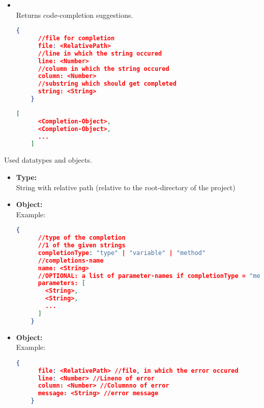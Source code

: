 \begin{itemize}
  \item {} \\
  Returns code-completion suggestions. \\
  \begin{lstlisting}[basicstyle=\small,
    language=json]
    {
      //file for completion
      file: <RelativePath>
      //line in which the string occured
      line: <Number>
      //column in which the string occured
      column: <Number>
      //substring which should get completed
      string: <String>
    }
  \end{lstlisting}
  \begin{lstlisting}[basicstyle=\small,
    language=json]
    [
      <Completion-Object>,
      <Completion-Object>,
      ...
    ]
  \end{lstlisting}
\end{itemize}

Used datatypes and objects.
\begin{itemize}
  \item \textbf{Type:}  \\
  String with relative path (relative to the root-directory of the project)

  \item \textbf{Object:}  \\
  Example:
  \begin{lstlisting}[basicstyle=\small,
    language=json]
    {
      //type of the completion
      //1 of the given strings
      completionType: "type" | "variable" | "method"
      //completions-name
      name: <String>
      //OPTIONAL: a list of parameter-names if completionType = "method"
      parameters: [
        <String>,
        <String>,
        ...
      ]
    }
  \end{lstlisting}

  \item \textbf{Object:}  \\
  Example:
  \begin{lstlisting}[basicstyle=\small,
    language=json]
    {
      file: <RelativePath> //file, in which the error occured
      line: <Number> //Lineno of error
      column: <Number> //Columnno of error
      message: <String> //error message
    }
  \end{lstlisting}
\end{itemize}
